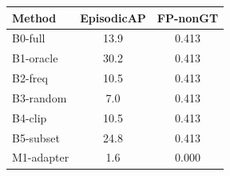 \begin{tabular}{l cc}
\toprule
Method & EpisodicAP & FP-nonGT \\
\midrule
B0-full & 13.9 & 0.413 \\
B1-oracle & 30.2 & 0.413 \\
B2-freq & 10.5 & 0.413 \\
B3-random & 7.0 & 0.413 \\
B4-clip & 10.5 & 0.413 \\
B5-subset & 24.8 & 0.413 \\
M1-adapter & 1.6 & 0.000 \\
\bottomrule
\end{tabular}
